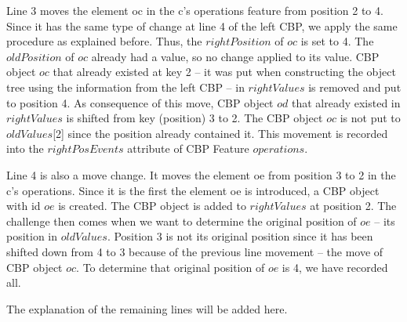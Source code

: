 \documentclass{llncs}
\begin{document}
Line 3 moves the element \textsf{oc} in the \textsf{c}'s \textsf{operations} feature from position 2 to 4.  Since it has the same type of change at line 4 of the left CBP,  we apply the same procedure as explained before. Thus, the $rightPosition$ of $oc$ is set to 4. The $oldPosition$ of $oc$ already had a value, so no change applied to its value. CBP object $oc$ that already existed at key 2 -- it was put when constructing the object tree using the information from the left CBP -- in $rightValues$ is removed and put to position 4. As consequence of this move, CBP object $od$ that already existed in $rightValues$ is shifted from key (position) 3 to 2. The CBP object $oc$ is not put to $oldValues$[2] since the position already contained it. This movement is recorded into the $rightPosEvents$ attribute of CBP Feature $operations$.        

Line 4 is also a move change. It moves the element \textsf{oe} from position 3 to 2 in the \textsf{c}'s \textsf{operations}. Since it is the first the element \textsf{oe} is introduced, a CBP object with id $oe$ is created. The CBP object is added to $rightValues$ at position 2. The challenge then comes when we want to determine the original position of $oe$ -- its position in $oldValues$. Position 3 is not its original position since it has been shifted down from 4 to 3 because of the previous line movement -- the move of CBP object $oc$. To determine that original position of $oe$ is 4, we have recorded all.

The explanation of the remaining lines will be added here.
\end{document}

